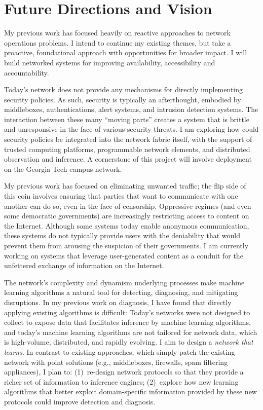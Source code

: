 \pagebreak
\section*{Future Directions and Vision}

My previous work has focused heavily on reactive approaches to network
operations problems.  I intend to continue my existing themes, but take
a proactive, foundational approach with opportunities for broader
impact.  I will build networked systems for improving availability,
accessibility and accountability.

 Today's network does not provide any
mechanisms for directly implementing security policies.  As such,
security is typically an afterthought, embodied by middleboxes,
authentications, alert systems, and intrusion detection systems. The
interaction between these many ``moving parts'' creates a system that is
brittle and unresponsive in the face of various security threats.  I am
exploring how could security policies be integrated into the network
fabric itself, with the support of trusted computing platforms,
programmable network elements, and distributed observation and
inference.  A cornerstone of this project will involve deployment on the
Georgia Tech campus network.

  My previous work has
focused on eliminating unwanted traffic; the flip side of this coin
involves ensuring that parties that want to communicate with one another
can do so, even in the face of censorship.  Oppressive regimes (and even
some democratic governments) are increasingly restricting access to
content on the Internet.  Although some systems today enable anonymous
communication, these systems do not typically provide users with the
deniability that would prevent them from arousing the suspicion of their
governments.  I am currently working on systems that leverage
user-generated content as a conduit for the unfettered exchange of
information on the Internet.

The network's complexity and dynamism underlying processes make machine
learning algorithms a natural tool for detecting, diagnosing, and
mitigating disruptions.  In my previous work on diagnosis, I have found
that directly applying existing algorithms is difficult: Today's
networks were not designed to collect to expose data that facilitates
inference by machine learning algorithms, and today's machine learning
algorithms are not tailored for network data, which is high-volume,
distributed, and rapidly evolving.  I aim to design a {\em network that
learns}. In contrast to existing approaches, which simply patch the
existing network with point solutions (e.g., middleboxes, firewalls,
spam filtering appliances), I plan to: (1)~re-design network protocols
so that they provide a richer set of information to inference engines;
(2)~explore how new learning algorithms that better exploit
domain-specific information provided by these new protocols could
improve detection and diagnosis.

